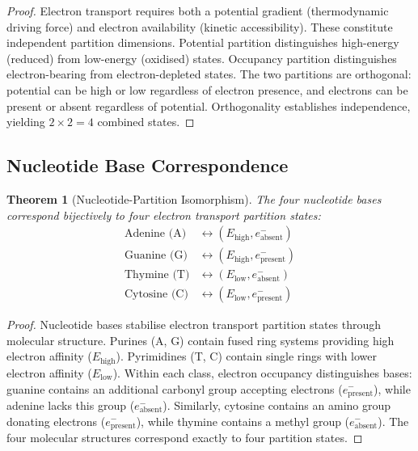 \documentclass[11pt,a4paper]{article}
\newtheorem{theorem}{Theorem}[section]
\theoremstyle{remark}
\begin{document}
\begin{proof}
Electron transport requires both a potential gradient (thermodynamic driving force) and electron availability (kinetic accessibility). These constitute independent partition dimensions. Potential partition distinguishes high-energy (reduced) from low-energy (oxidised) states. Occupancy partition distinguishes electron-bearing from electron-depleted states. The two partitions are orthogonal: potential can be high or low regardless of electron presence, and electrons can be present or absent regardless of potential. Orthogonality establishes independence, yielding $2 \times 2 = 4$ combined states.
\end{proof}

\subsection{Nucleotide Base Correspondence}

\begin{theorem}[Nucleotide-Partition Isomorphism]
\label{thm:nucleotide_partition_iso}
The four nucleotide bases correspond bijectively to four electron transport partition states:
\begin{align}
\text{Adenine (A)} &\leftrightarrow (E_{\text{high}}, e^-_{\text{absent}}) \\
\text{Guanine (G)} &\leftrightarrow (E_{\text{high}}, e^-_{\text{present}}) \\
\text{Thymine (T)} &\leftrightarrow (E_{\text{low}}, e^-_{\text{absent}}) \\
\text{Cytosine (C)} &\leftrightarrow (E_{\text{low}}, e^-_{\text{present}})
\end{align}
\end{theorem}

\begin{proof}
Nucleotide bases stabilise electron transport partition states through molecular structure. Purines (A, G) contain fused ring systems providing high electron affinity ($E_{\text{high}}$). Pyrimidines (T, C) contain single rings with lower electron affinity ($E_{\text{low}}$). Within each class, electron occupancy distinguishes bases: guanine contains an additional carbonyl group accepting electrons ($e^-_{\text{present}}$), while adenine lacks this group ($e^-_{\text{absent}}$). Similarly, cytosine contains an amino group donating electrons ($e^-_{\text{present}}$), while thymine contains a methyl group ($e^-_{\text{absent}}$). The four molecular structures correspond exactly to four partition states.
\end{proof}
\end{document}
